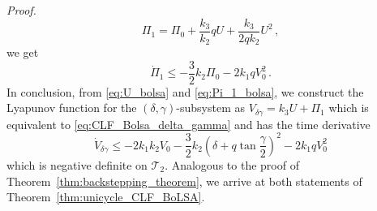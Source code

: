 \documentclass[10pt,a4paper]{amsart}
\renewenvironment{proof}[1][Proof]{\par\pushQED{\qed}\normalfont\textit{#1.}~}{\popQED\par}
\begin{document}
\begin{proof}
\begin{equation}
\Pi_1 = \Pi_0 + \frac{k_3 }{k_2} q  U  + \frac{k_3 }{2 q k_2} U^2\,, \label{eq:Pi_1_bolsa}
\end{equation}
we get
\begin{equation}
\dot\Pi_1 \leq - \frac{3}{2}k_2\Pi_0 - 2 k_1 q V_0^2\,.
\end{equation}
In conclusion, from \eqref{eq:U_bolsa} and \eqref{eq:Pi_1_bolsa}, we construct the Lyapunov function for the $(\delta, \gamma)$-subsystem as $V_{\delta \gamma} = k_3 U + \Pi_1$ which is equivalent to \eqref{eq:CLF_Bolsa_delta_gamma} 
and has the time derivative \begin{equation}
\dot V_{\delta \gamma} \le  - 2k_1 k_2 V_0 - \frac{3}{2}k_2 \left(\delta + q \tan \frac{\gamma}{2}\right)^2 - 2k_1 q V_0^2
\label{eq:V_dot_Bolsa}
\end{equation} 
which is negative definite on $\mathcal{T}_2$. Analogous to the proof of Theorem~\ref{thm:backstepping_theorem}, we arrive at both statements of Theorem~\ref{thm:unicycle_CLF_BoLSA}.
\end{proof}
\end{document}
